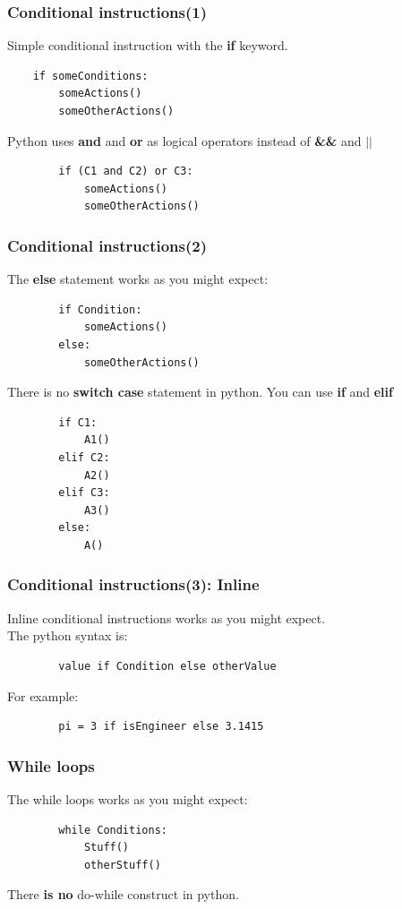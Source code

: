 \documentclass{beamer}
\begin{document}
\begin{frame}[fragile]
    \frametitle{Conditional instructions(1)}
    Simple conditional instruction with the \textbf{if} keyword.
    \begin{verbatim}
    if someConditions:
        someActions()
        someOtherActions()
    \end{verbatim}
    Python uses \textbf{and} and \textbf{or} as logical operators instead of \textbf{\&\&} and \textbf{$\vert\vert$}
    \begin{verbatim}
        if (C1 and C2) or C3:
            someActions()
            someOtherActions()
    \end{verbatim}
\end{frame}

\begin{frame}[fragile]
    \frametitle{Conditional instructions(2)}
    The \textbf{else} statement works as you might expect:
    \begin{verbatim}
        if Condition:
            someActions()
        else:
            someOtherActions()
    \end{verbatim}

    There is no \textbf{switch case} statement in python. You can use \textbf{if} and \textbf{elif}
    \begin{verbatim}
        if C1:
            A1()
        elif C2:
            A2()
        elif C3:
            A3()
        else:
            A()
    \end{verbatim}
\end{frame}

\begin{frame}[fragile]
    \frametitle{Conditional instructions(3): Inline}
    Inline conditional instructions works as you might expect.\\
    The python syntax is:
    \begin{verbatim}
        value if Condition else otherValue
    \end{verbatim} 
    For example:
    \begin{verbatim}
        pi = 3 if isEngineer else 3.1415
    \end{verbatim} 
    
\end{frame}


\begin{frame}[fragile]
    \frametitle{While loops}
    The while loops works as you might expect:
    \begin{verbatim}
        while Conditions:
            Stuff()
            otherStuff()
    \end{verbatim}
    There \textbf{is no} do-while construct in python.
\end{frame} 
\end{document}
